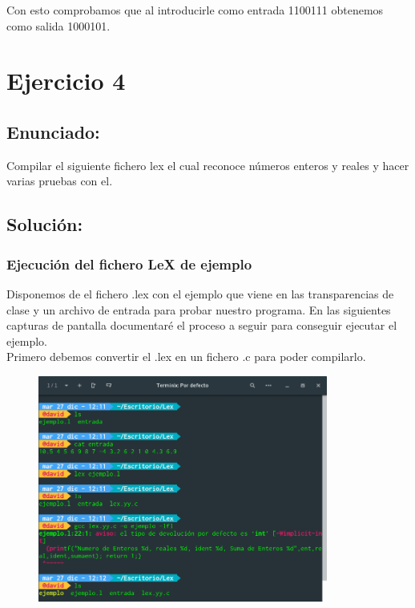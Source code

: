 \documentclass[10pt,a4paper,spanish]{report}
\begin{document}
\noindent
Con esto comprobamos que al introducirle como entrada 1100111 obtenemos como salida 1000101.


\chapter{Ejercicio 4}

\section{Enunciado:}

\noindent
Compilar el siguiente fichero lex el cual reconoce números enteros y reales y hacer varias pruebas con el.


\newpage
\section{Solución:}

\subsection{Ejecución del fichero LeX de ejemplo}

\noindent
Disponemos de el fichero .lex con el ejemplo que viene en las transparencias de clase y un archivo de entrada para probar nuestro programa.
En las siguientes capturas de pantalla documentaré el proceso a seguir para conseguir ejecutar el ejemplo. \\

\noindent
Primero debemos convertir el .lex en un fichero .c para poder compilarlo.

\begin{figure}[!hbp]
	\centering  \includegraphics[width=0.85\textwidth]{Imagenes/Ejercicio4-1.png}
\end{figure}
\end{document}
